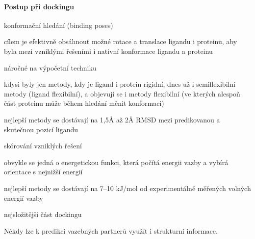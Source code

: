 \documentclass[DIV=8]{scrreprt}
\begin{document}
\paragraph{Postup při dockingu}
\begin{myItemize}[nosep]
    \item konformační hledání (binding poses)
\begin{myItemize}[nosep]
    \item cílem je efektivně obsáhnout možné rotace a translace ligandu i proteinu, aby byla mezi vzniklými řešeními i nativní konformace ligandu a proteinu
    \item náročné na výpočetní techniku
\begin{myItemize}[nosep]
    \item kdysi byly jen metody, kdy je ligand i protein rigidní, dnes už i semiflexibilní metody (ligand flexibilní), a objevují se i metody flexibilní (ve kterých alespoň část proteinu může během hledání měnit konformaci)
\end{myItemize}

    \item nejlepší metody se dostávají na 1,5Å až 2Å RMSD mezi predikovanou a skutečnou pozicí ligandu
\end{myItemize}

    \item skórování vzniklých řešení
\begin{myItemize}[nosep]
    \item obvykle se jedná o energetickou funkci, která počítá energii vazby a vybírá orientace s nejnižší energií
\begin{myItemize}[nosep]
    \item nejlepší metody se dostávají na 7--10 kJ/mol od experimentálně měřených volných energií vazby
\end{myItemize}

    \item nejsložitější část dockingu
\end{myItemize}

\end{myItemize}



Někdy lze k predikci vazebných partnerů využít i strukturní informace.

\end{document}

